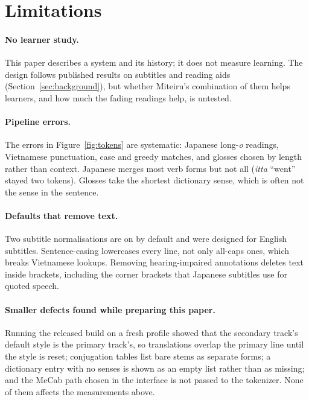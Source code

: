 ﻿\documentclass[11pt,a4paper]{article}
\begin{document}
\section{Limitations}
\label{sec:limitations}

\paragraph{No learner study.}
This paper describes a system and its history; it does not measure learning. The design follows published results on subtitles and reading aids (Section~\ref{sec:background}), but whether Miteiru's combination of them helps learners, and how much the fading readings help, is untested.

\paragraph{Pipeline errors.}
The errors in Figure~\ref{fig:tokens} are systematic: Japanese long-\emph{o} readings, Vietnamese punctuation, case and greedy matches, and glosses chosen by length rather than context. Japanese merges most verb forms but not all (\emph{itta} ``went'' stayed two tokens). Glosses take the shortest dictionary sense, which is often not the sense in the sentence.

\paragraph{Defaults that remove text.}
Two subtitle normalisations are on by default and were designed for English subtitles. Sentence-casing lowercases every line, not only all-caps ones, which breaks Vietnamese lookups. Removing hearing-impaired annotations deletes text inside brackets, including the corner brackets that Japanese subtitles use for quoted speech.

\paragraph{Smaller defects found while preparing this paper.}
Running the released build on a fresh profile showed that the secondary track's default style is the primary track's, so translations overlap the primary line until the style is reset; conjugation tables list bare stems as separate forms; a dictionary entry with no senses is shown as an empty list rather than as missing; and the MeCab path chosen in the interface is not passed to the tokenizer. None of them affects the measurements above.
\end{document}
